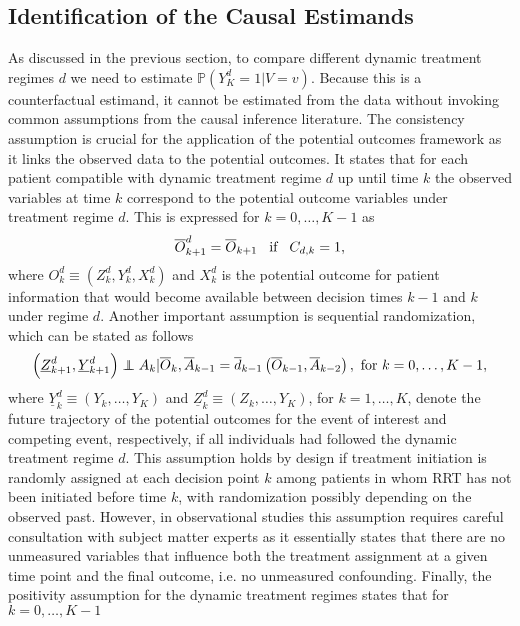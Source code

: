 \documentclass[12pt]{article}
\begin{document}
\subsection{Identification of the Causal Estimands}

As discussed in the previous section, to compare different dynamic treatment regimes $d$ we need to estimate $\mathbb{P} \left( Y_K^d = 1 \vert V = v \right)$. Because this is a counterfactual estimand, it cannot be estimated from the data without invoking common assumptions from the causal inference literature. The consistency assumption is crucial for the application of the potential outcomes framework as it links the observed data to the potential outcomes. It states that for each patient compatible with dynamic treatment regime $d$ up until time $k$ the observed variables at time $k$ correspond to the potential outcome variables under treatment regime $d$. This is expressed for $k = 0, \dots, K-1$ as
\begin{equation*}
\overline{O}_{k+1}^d = \overline{O}_{k+1} \hspace{0.3cm} \text{if} \hspace{0.3cm} C_{d,k} = 1,
\end{equation*}
where $O_{k}^d \equiv \left( Z_{k}^d, Y_{k}^d, X_{k}^d \right)$ and $X_{k}^d$ is the potential outcome for patient information that would become available between decision times $k-1$ and $k$ under regime $d$. Another important assumption is sequential randomization, which can be stated as follows 
\begin{equation*}
\left( \underline{Z}_{k+1}^d,  \underline{Y}_{k+1}^d \right) \perp\!\!\!\!\perp A_k \vert \overline{O}_k,  \overline{A}_{k-1} = \overline{d}_{k-1} \left( \overline{O}_{k-1}, \overline{A}_{k-2} \right), \text{ for } k = 0, \dots, K-1,
\end{equation*}
where $\underline{Y}_{k}^d \equiv \left( Y_k, \dots, Y_K \right)$ and $\underline{Z}_{k}^d \equiv \left( Z_k, \dots, Y_K \right)$, for $k = 1, \dots, K$, denote the future trajectory of the potential outcomes for the event of interest and competing event, respectively,  if all individuals had followed the dynamic treatment regime $d$. This assumption holds by design if treatment initiation is randomly assigned at each decision point $k$ among patients in whom RRT has not been initiated before time $k$, with randomization possibly depending on the observed past. However, in observational studies this assumption requires careful consultation with subject matter experts as it essentially states that there are no unmeasured variables that influence both the treatment assignment at a given time point and the final outcome, i.e. no unmeasured confounding. Finally, the positivity assumption for the dynamic treatment regimes states that for $k = 0, \dots, K-1$ 
\end{document}
